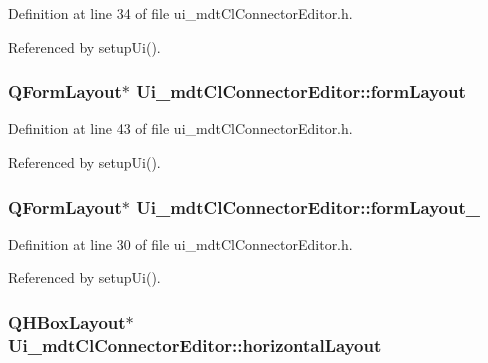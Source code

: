Definition at line 34 of file ui\-\_\-mdt\-Cl\-Connector\-Editor.\-h.



Referenced by setup\-Ui().

\hypertarget{class_ui__mdt_cl_connector_editor_a1008ba6491f57c0893c2816660669618}{
\subsubsection[{form\-Layout}]{\setlength{\rightskip}{0pt plus 5cm}Q\-Form\-Layout$\ast$ Ui\-\_\-mdt\-Cl\-Connector\-Editor\-::form\-Layout}}\label{class_ui__mdt_cl_connector_editor_a1008ba6491f57c0893c2816660669618}


Definition at line 43 of file ui\-\_\-mdt\-Cl\-Connector\-Editor.\-h.



Referenced by setup\-Ui().

\hypertarget{class_ui__mdt_cl_connector_editor_aeb5562d1041525d05a602074883c1d6b}{
\subsubsection[{form\-Layout\-\_\-2}]{\setlength{\rightskip}{0pt plus 5cm}Q\-Form\-Layout$\ast$ Ui\-\_\-mdt\-Cl\-Connector\-Editor\-::form\-Layout\-\_}}\label{class_ui__mdt_cl_connector_editor_aeb5562d1041525d05a602074883c1d6b}


Definition at line 30 of file ui\-\_\-mdt\-Cl\-Connector\-Editor.\-h.



Referenced by setup\-Ui().

\hypertarget{class_ui__mdt_cl_connector_editor_a30390e248b79f1e006eb70ad31fd74ac}{
\subsubsection[{horizontal\-Layout}]{\setlength{\rightskip}{0pt plus 5cm}Q\-H\-Box\-Layout$\ast$ Ui\-\_\-mdt\-Cl\-Connector\-Editor\-::horizontal\-Layout}}\label{class_ui__mdt_cl_connector_editor_a30390e248b79f1e006eb70ad31fd74ac}


